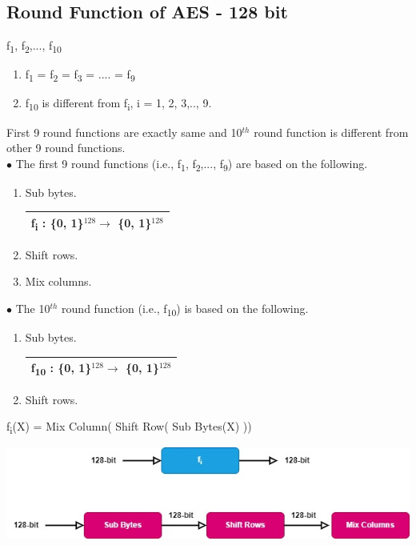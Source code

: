 \documentclass[11pt]{article}
\begin{document}
	\subsection{Round Function of AES - 128 bit}
	f\textsubscript{1}, f\textsubscript{2},..., f\textsubscript{10}
	\begin{enumerate}[label=(\Alph*)]
		\item f\textsubscript{1} = f\textsubscript{2} = f\textsubscript{3} = .... = f\textsubscript{9}
		\item f\textsubscript{10} is different from f\textsubscript{i}, i = 1, 2, 3,.., 9.
	\end{enumerate}
	First 9 round functions are exactly same and 10$^{th}$ round function is different from other 9 round functions.\vspace{0.3cm}\\
	$\bullet$ The first 9 round functions (i.e., f\textsubscript{1}, f\textsubscript{2},..., f\textsubscript{9}) are based on the following.
	\begin{enumerate}[label=\roman*.]
		\item Sub bytes.\hfill \begin{tabular}{| c |}\hline f\textsubscript{i} : \{0, 1\}$^{128} \rightarrow$ \{0, 1\}$^{128}$ \\\hline\end{tabular}
		\item Shift rows.
		\item Mix columns.
	\end{enumerate}
	$\bullet$ The 10$^{th}$ round function (i.e., f\textsubscript{10}) is based on the following.
	\begin{enumerate}[label=\roman*.]
		\item Sub bytes.\hfill \begin{tabular}{| c |}\hline f\textsubscript{10} : \{0, 1\}$^{128} \rightarrow$ \{0, 1\}$^{128}$ \\\hline\end{tabular}
		\item Shift rows.
	\end{enumerate}
	f\textsubscript{i}(X) = Mix Column( Shift Row( Sub Bytes(X) ))
	\begin{center}
		\includegraphics[width = 17cm]{Round Function of AES.jpg}
	\end{center}
\end{document}
